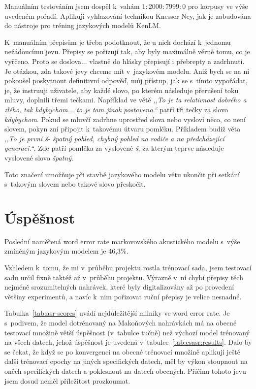 Manuálním testováním jsem dospěl k~vahám $1 : 2000 : 7999 : 0$ pro korpusy ve
výše uvedeném pořadí. Aplikuji vyhlazování technikou
Knesser-Ney\cite{chen1999empirical}, jak je zabudována do nástroje pro tréning
jazykových modelů KenLM\cite{heafield2011kenlm}.

K~manuálním přepisům je třeba podotknout, že u nich dochází k~jednomu
nežádoucímu jevu. Přepisy se pořizují tak, aby byly maximálně věrné tomu, co je
vyřčeno. Proto se doslova... vlastně do hlásky přepisují i přebrepty a zadrhnutí.
Je otázkou, zda takové jevy chceme mít v~jazykovém modelu. Aniž bych se na ni
pokoušel poskytnout definitivní odpověď, můj přístup, jak se s~tímto vypořádat,
je, že instruuji uživatele, aby každé slovo, po kterém následuje přerušení toku
mluvy, doplnili třemi tečkami. Například ve větě {\em ,,To je ta relativnost
dobrého a zlého, tak kdybychom... to je tam jinak postaveno.``} patří tři tečky
za slovo {\em kdybychom}. Pokud se mluvčí zadrhne uprostřed slova nebo vysloví
něco, co není slovem, pokyn zní připojit k~takovému útvaru pomlčku. Příkladem
budiž věta {\em ,,To je první š- špatný pohled, chybný pohled na rodiče a na
předcházející generaci.``}. Zde patří pomlčka za vyslovené {\em š}, za kterým
teprve následuje vyslovené slovo {\em špatný}.

Toto značení umožňuje při stavbě jazykového modelu větu ukončit při setkání
s~takovým slovem nebo takové slovo přeskočit.

\section{Úspěšnost}
\label{sec:evaluace}

Poslední naměřená word error rate markovovského akustického modelu s~výše zmíněným
jazykovým modelem je 46,3\%.

Vzhledem k~tomu, že mi v~průběhu projektu rostla trénovací sada, jsem testovací sadu
určil fixně taktéž až v~průběhu projektu. Výrazně v~ní chybí přepisy těch
nejméně srozumitelných nahrávek, které byly digitalizovány až po provedení
většiny experimentů, a navíc k~nim pořizovat ruční přepisy je velice nesnadné.

Tabulka~\ref{tab:asr-scores} uvádí nejdůležitější milníky ve word error rate. Je
s~podivem, že model dotrénovaný na Makoňových nahrávkách má na obecné testovací
množině větší úspěšnost (v~tabulce tučně) než výchozí model trénovaný na všech datech, jehož
úspěšnost je uvedená v~tabulce~\ref{tab:csasr:results}. Dalo by se čekat, že
když se po konvergenci na obecné trénovací množině aplikují ještě
další trénovací epochy na jiných specifických datech, měl by výkon stoupnout na
oněch specifických datech a poklesnout na datech obecných. Příčinu tohoto jevu
jsem dosud neměl příležitost prozkoumat.

